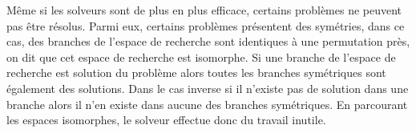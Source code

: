 %
%
%

%
%



%



Même si les solveurs sont de plus en plus efficace, certains problèmes ne peuvent pas être résolus.
Parmi eux, certains problèmes présentent des symétries, dans ce cas, des branches de l'espace de recherche 
sont identiques à une permutation près, on dit que cet espace de recherche est isomorphe.
Si une branche de l'espace de recherche est solution du problème alors toutes les branches symétriques
sont également des solutions. Dans le cas inverse si il n'existe pas de solution dans une branche alors il n'en
existe dans aucune des branches symétriques.
En parcourant les espaces isomorphes, le solveur effectue donc du travail inutile.

